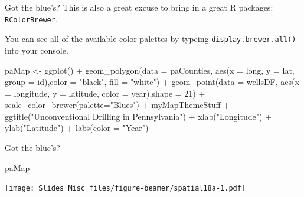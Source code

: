 \documentclass[
  ignorenonframetext,
]{beamer}
\newenvironment{Shaded}{\begin{snugshade}}{\end{snugshade}}
\newcommand{\AttributeTok}[1]{\textcolor[rgb]{0.77,0.63,0.00}{#1}}
\newcommand{\DecValTok}[1]{\textcolor[rgb]{0.00,0.00,0.81}{#1}}
\newcommand{\FunctionTok}[1]{\textcolor[rgb]{0.00,0.00,0.00}{#1}}
\newcommand{\NormalTok}[1]{#1}
\newcommand{\OtherTok}[1]{\textcolor[rgb]{0.56,0.35,0.01}{#1}}
\newcommand{\SpecialCharTok}[1]{\textcolor[rgb]{0.00,0.00,0.00}{#1}}
\newcommand{\StringTok}[1]{\textcolor[rgb]{0.31,0.60,0.02}{#1}}
\begin{document}
\begin{frame}[fragile]{Got the blue's?}
\protect\hypertarget{got-the-blues-1}{}
This is also a great excuse to bring in a great R packages:
\texttt{RColorBrewer}.

You can see all of the available color palettes by typeing
\texttt{display.brewer.all()} into your console.

\tiny

\begin{Shaded}
\begin{Highlighting}[]
\NormalTok{paMap }\OtherTok{\textless{}{-}} \FunctionTok{ggplot}\NormalTok{() }\SpecialCharTok{+}
    \FunctionTok{geom\_polygon}\NormalTok{(}\AttributeTok{data =}\NormalTok{ paCounties, }\FunctionTok{aes}\NormalTok{(}\AttributeTok{x =}\NormalTok{ long, }\AttributeTok{y =}\NormalTok{ lat, }\AttributeTok{group =}\NormalTok{ id),}\AttributeTok{color =} \StringTok{"black"}\NormalTok{, }\AttributeTok{fill =} \StringTok{"white"}\NormalTok{) }\SpecialCharTok{+}
    \FunctionTok{geom\_point}\NormalTok{(}\AttributeTok{data =}\NormalTok{ wellsDF, }\FunctionTok{aes}\NormalTok{(}\AttributeTok{x =}\NormalTok{ longitude, }\AttributeTok{y =}\NormalTok{ latitude, }\AttributeTok{color =}\NormalTok{ year),}\AttributeTok{shape =} \DecValTok{21}\NormalTok{) }\SpecialCharTok{+}
    \FunctionTok{scale\_color\_brewer}\NormalTok{(}\AttributeTok{palette=}\StringTok{"Blues"}\NormalTok{) }\SpecialCharTok{+}
\NormalTok{    myMapThemeStuff }\SpecialCharTok{+} 
    \FunctionTok{ggtitle}\NormalTok{(}\StringTok{"Unconventional Drilling in Pennsylvania"}\NormalTok{) }\SpecialCharTok{+}
    \FunctionTok{xlab}\NormalTok{(}\StringTok{"Longitude"}\NormalTok{) }\SpecialCharTok{+} 
    \FunctionTok{ylab}\NormalTok{(}\StringTok{"Latitude"}\NormalTok{) }\SpecialCharTok{+}
    \FunctionTok{labs}\NormalTok{(}\AttributeTok{color =} \StringTok{"Year"}\NormalTok{)}
\end{Highlighting}
\end{Shaded}
\end{frame}

\begin{frame}[fragile]{Got the blue's?}
\protect\hypertarget{got-the-blues-2}{}
\begin{Shaded}
\begin{Highlighting}[]
\NormalTok{paMap}
\end{Highlighting}
\end{Shaded}

\texttt{[image: Slides\_Misc\_files/figure-beamer/spatial18a-1.pdf]}
\end{frame}
\end{document}
